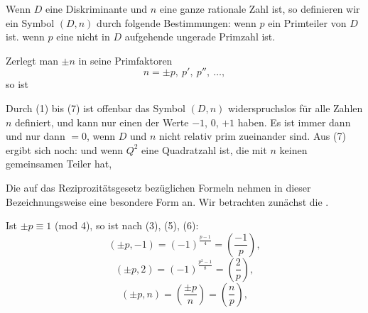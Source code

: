 
Wenn $D$ eine Diskriminante und $n$ eine ganze rationale Zahl ist, so definieren wir ein Symbol $(D,n)$ durch folgende Bestimmungen:
wenn $p$ ein Primteiler von $D$ ist.
wenn $p$ eine nicht in $D$ aufgehende ungerade Primzahl ist.

Zerlegt man $\pm n$ in seine Primfaktoren
\[
n = \pm p,\ p',\ p'',\ \dots,
\]
so ist

Durch (1) bis (7) ist offenbar das Symbol $(D,n)$ widerspruchslos für alle Zahlen $n$ definiert, und kann nur einen der Werte $-1$, $0$, $+1$ haben. Es ist immer dann und nur dann $=0$, wenn $D$ und $n$ nicht relativ prim zueinander sind. Aus (7) ergibt sich noch:
und wenn $Q^2$ eine Quadratzahl ist, die mit $n$ keinen gemeinsamen Teiler hat,

Die auf das Reziprozitätsgesetz bezüglichen Formeln nehmen in dieser Bezeichnungsweise eine besondere Form an. Wir betrachten zunächst die .

Ist $\pm p \equiv 1$ (mod 4), so ist nach (3), (5), (6):
\[
(\pm p, -1) = (-1)^{\frac{p-1}{4}} = \left(\dfrac{-1}{p}\right),
\]
\[
(\pm p, 2) = (-1)^{\frac{p^2-1}{8}} = \left(\dfrac{2}{p}\right),
\]
\[
(\pm p, n) = \left(\dfrac{\pm p}{n}\right) = \left(\dfrac{n}{p}\right),
\]

